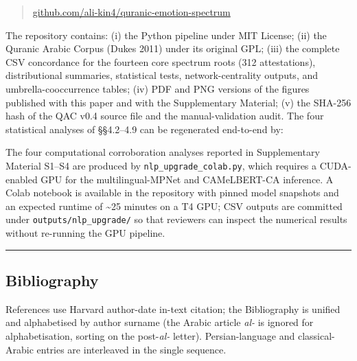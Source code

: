 \begin{quote}
\href{https://github.com/ali-kin4/quranic-emotion-spectrum}{github.com/ali-kin4/quranic-emotion-spectrum}
\end{quote}

The repository contains: (i) the Python pipeline under MIT License; (ii)
the Quranic Arabic Corpus (Dukes 2011) under its original GPL; (iii) the
complete CSV concordance for the fourteen core spectrum roots (312
attestations), distributional summaries, statistical tests,
network-centrality outputs, and umbrella-cooccurrence tables; (iv) PDF
and PNG versions of the figures published with this paper and with the
Supplementary Material; (v) the SHA-256 hash of the QAC v0.4 source file
and the manual-validation audit. The four statistical analyses of
§§4.2--4.9 can be regenerated end-to-end by:

\begin{Shaded}
\begin{Highlighting}[]
\end{Highlighting}
\end{Shaded}

The four computational corroboration analyses reported in Supplementary
Material S1--S4 are produced by \texttt{nlp\_upgrade\_colab.py}, which
requires a CUDA-enabled GPU for the multilingual-MPNet and CAMeLBERT-CA
inference. A Colab notebook is available in the repository with pinned
model snapshots and an expected runtime of \textasciitilde25 minutes on
a T4 GPU; CSV outputs are committed under \texttt{outputs/nlp\_upgrade/}
so that reviewers can inspect the numerical results without re-running
the GPU pipeline.

\begin{center}\rule{0.5\linewidth}{0.5pt}\end{center}

\subsection{Bibliography}\label{bibliography}

References use Harvard author-date in-text citation; the Bibliography is
unified and alphabetised by author surname (the Arabic article
\emph{al-} is ignored for alphabetisation, sorting on the
post-\emph{al-} letter). Persian-language and classical-Arabic entries
are interleaved in the single sequence.

